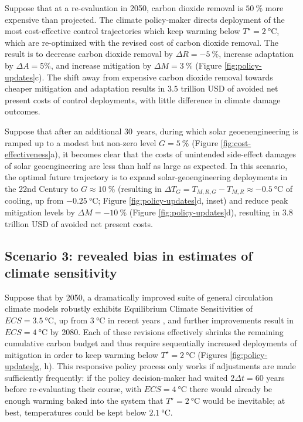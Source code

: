 \documentclass[9pt,twocolumn,twoside,lineno]{pnas-new}
\begin{document}
Suppose that at a re-evaluation in 2050, carbon dioxide removal is $\SI{50}{\%}$ more expensive than projected. The climate policy-maker directs deployment of the most cost-effective control trajectories which keep warming below $T^{\star}=\SI{2}{\celsius}$, which are re-optimized with the revised cost of carbon dioxide removal. The result is to decrease carbon dioxide removal by $\Delta R = \SI{-5}{\%}$, increase adaptation by $\Delta A = 5\%$, and increase mitigation by $\Delta M = \SI{3}{\%}$ (Figure \ref{fig:policy-updates}c). The shift away from expensive carbon dioxide removal towards cheaper mitigation and adaptation results in $3.5$ trillion USD of avoided net present costs of control deployments, with little difference in climate damage outcomes.

Suppose that after an additional \SI{30}{years}, during which solar geoenengineering is ramped up to a modest but non-zero level $G=\SI{5}{\%}$ (Figure \ref{fig:cost-effectiveness}a), it becomes clear that the costs of unintended side-effect damages of solar geoengineering are less than half as large as expected. In this scenario, the optimal future trajectory is to expand solar-geoengineering deployments in the 22nd Century to $G \approx \SI{10}{\%}$ (resulting in $\Delta T_{G} = T_{M,R,G} - T_{M,R} \approx \SI{-0.5}{\celsius}$ of cooling, up from $\SI{-0.25}{\celsius}$; Figure \ref{fig:policy-updates}d, inset) and reduce peak mitigation levels by $\Delta M = \SI{-10}{\%}$ (Figure \ref{fig:policy-updates}d), resulting in $3.8$ trillion USD of avoided net present costs.

\subsection*{Scenario 3: revealed bias in estimates of climate sensitivity}

Suppose that by 2050, a dramatically improved suite of general circulation climate models robustly exhibits Equilibrium Climate Sensitivities of $ECS=\SI{3.5}{\celsius}$, up from $\SI{3}{\celsius}$ in recent years \citep{geoffroy_transient_2012}, and further improvements result in $ECS=\SI{4}{\celsius}$ by 2080. Each of these revisions effectively shrinks the remaining cumulative carbon budget and thus require sequentially increased deployments of mitigation in order to keep warming below $T^{\star} = \SI{2}{\celsius}$ (Figures \ref{fig:policy-updates}g, h). This responsive policy process only works if adjustments are made sufficiently frequently: if the policy decision-maker had waited $2\Delta t = 60$ years before re-evaluating their course, with $ECS=\SI{4}{\celsius}$ there would already be enough warming baked into the system that $T^{\star} = \SI{2}{\celsius}$ would be inevitable; at best, temperatures could be kept below $\SI{2.1}{\celsius}$.
\end{document}
